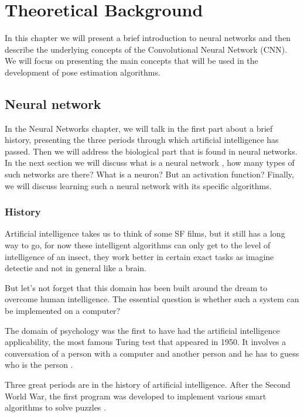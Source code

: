 \chapter{Theoretical Background}

In this chapter we will present a brief introduction to neural networks and then describe the underlying concepts of the Convolutional Neural Network (CNN).
We will focus on presenting the main concepts that will be used in the development of pose estimation algorithms.

\section{Neural network}

In the Neural Networks chapter, we will talk in the first part about a brief history, presenting the three periods through which artificial intelligence has passed.
Then we will address the biological part that is found in neural networks.
In the next section we will discuss what is a neural network , how many types of such networks are there? What is a neuron? But an activation function?
Finally, we will discuss learning such a neural network with its specific algorithms.

\subsection{History}
Artificial intelligence takes us to think of some SF films, 
but it still has a long way to go, for now these intelligent algorithms can
only get to the level of intelligence of an insect, 
they work better in certain exact tasks as imagine detectie  and not in general like a brain.

But let's not forget that this domain has been built around the dream to overcome human intelligence.
The essential question is whether such a system can be implemented on a computer?

The domain of psychology was the first to have had the artificial intelligence applicability, 
the most famous Turing test that appeared in 1950. 
It involves a conversation of a person with a computer and another person and he has to guess who is the person \cite{historyofneuronalnetwork}. 

Three great periods are in the history of artificial intelligence. 
After the Second World War, the first program was developed to implement various smart algorithms to solve puzzles \cite{historyofneuronalnetwork}. 

